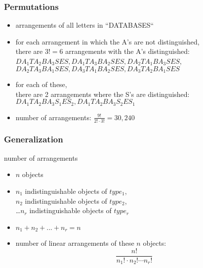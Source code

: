 \documentclass[dvipsnames]{beamer}
\begin{document}
\begin{frame}
  \frametitle{Permutations}

  \begin{example}
    \begin{itemize}
      \item arrangements of all letters in ``DATABASES``

      \pause
      \medskip
      \item for each arrangement in which the A's are not distinguished,\\
        there are $3! = 6$ arrangements with the A's distinguished:\\
        $DA_{1}TA_{2}BA_{3}SES,DA_{1}TA_{3}BA_{2}SES, DA_{2}TA_{1}BA_{3}SES$,\\
        $DA_{2}TA_{3}BA_{1}SES, DA_{3}TA_{1}BA_{2}SES, DA_{3}TA_{2}BA_{1}SES$

      \pause
      \item for each of these,\\
        there are 2 arrangements where the S's are distinguished:\\
        $DA_{1}TA_{2}BA_{3}S_{1}ES_{2},DA_{1}TA_{2}BA_{3}S_{2}ES_{1}$

      \pause
      \medskip
      \item number of arrangements: $\frac{9!}{2! \cdot 3!} = 30,240$
   \end{itemize}
  \end{example}
\end{frame}

\begin{frame}
  \frametitle{Generalization}
  
  \begin{block}{number of arrangements}
    \begin{itemize}
      \item $n$ objects
      \item $n_1$ indistinguishable objects of $type_1$,\\
        $n_2$ indistinguishable objects of $type_2$,\\
        \ldots $n_r$ indistinguishable objects of $type_r$
      \item $n_1 + n_2 + ... + n_r = n$

      \medskip
      \item number of linear arrangements of these $n$ objects:
      \begin{equation*}
        \frac{n!}{n_1! \cdot n_2! \cdots n_r!}
      \end{equation*}
    \end{itemize}
  \end{block}
\end{frame}
\end{document}
